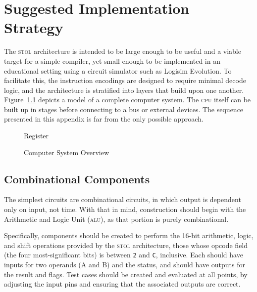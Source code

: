 \documentclass[12pt,english]{book}
\begin{document}
\chapter{Suggested Implementation Strategy}
The \textsc{stol} architecture is intended
to be large enough to be useful
and a viable target for a simple compiler,
yet small enough to be implemented in an educational setting
using a circuit simulator such as Logisim Evolution.
To facilitate this,
the instruction encodings are designed to require minimal decode logic,
and the architecture is stratified into layers
that build upon one another.
Figure~\ref{fig:system} depicts a model of a complete computer system.
The \textsc{cpu} itself can be built up in stages
before connecting to a bus or external devices.
The sequence presented in this appendix
is far from the only possible approach.

\begin{figure}[ht!]\centering
  \setbox\blob\hbox{Register}
  \caption{Computer System Overview}
  \label{fig:system}
\end{figure}

\section{Combinational Components}
The simplest circuits are combinational circuits,
in which output is dependent only on input, not time.
With that in mind, construction should begin
with the Arithmetic and Logic Unit (\textsc{alu}),
as that portion is purely combinational.

Specifically, components should be created to perform
the 16-bit arithmetic, logic, and shift operations
provided by the \textsc{stol} architecture,
those whose opcode field (the four most-significant bits)
is between \texttt{2} and \texttt{C}, inclusive.
Each should have inputs for two operands (A and B) and the status,
and should have outputs for the result and flags.
Test cases should be created and evaluated at all points,
by adjusting the input pins and ensuring
that the associated outputs are correct.
\end{document}
